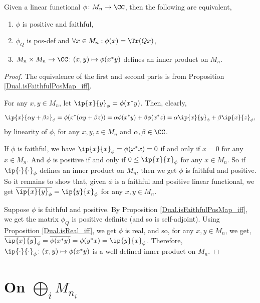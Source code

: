   \begin{theorem}\label{Dual.isFaithfulPosMap_tfae}
   \leanok
   Given a linear functional $\phi\colon{M_n}\to\CC$, then the following are equivalent,
   \begin{enumerate}[label=(\roman*)]
    \item $\phi$ is positive and faithful,
    \item $\phi_Q$ is pos-def and $\forall{x}\in{M_n}:\phi(x)=\Tr(Qx)$,
    \item $M_n\times{M_n}\to\CC\colon(x,y)\mapsto\phi(x^*y)$ defines an inner product on $M_n$.
   \end{enumerate}
  \end{theorem}
  \begin{proof}\leanok
   The equivalence of the first and second parts is from Proposition \ref{Dual.isFaithfulPosMap_iff}.
   
   For any $x,y\in{M_n}$, let $\ip{x}{y}_\phi=\phi(x^*y)$.
   Then, clearly,
   \[\ip{x}{\alpha{y}+\beta{z}}_\phi=\phi(x^*(\alpha{y}+\beta{z}))=\alpha\phi(x^*y)+\beta\phi(x^*z)=\alpha\ip{x}{y}_\phi+\beta\ip{x}{z}_\phi,\]
   by linearity of $\phi$, for any $x,y,z\in{M_n}$ and $\alpha,\beta\in\CC$.
   
   If $\phi$ is faithful, we have $\ip{x}{x}_\phi=\phi(x^*x)=0$ if and only if $x=0$ for any $x\in{M_n}$.
   And $\phi$ is positive if and only if $0\leq\ip{x}{x}_\phi$ for any $x\in{M_n}$. So if $\ip{\cdot}{\cdot}_\phi$ defines an inner product on $M_n$, then we get $\phi$ is faithful and positive. So it remains to show that, given $\phi$ is a faithful and positive linear functional, we get $\overline{\ip{x}{y}_\phi}=\ip{y}{x}_\phi$ for any $x,y\in{M_n}$.
     
   Suppose $\phi$ is faithful and positive. By Proposition \ref{Dual.isFaithfulPosMap_iff}, we get the matrix $\phi_Q$ is positive definite (and so is self-adjoint). Using Proposition \ref{Dual.isReal_iff}, we get $\phi$ is real, and so, for any $x,y\in{M_n}$, we get, $\overline{\ip{x}{y}_\phi}=\overline{\phi(x^*y)}=\phi(y^*x)=\ip{y}{x}_\phi$.
   Therefore, $\ip{\cdot}{\cdot}_\phi\colon(x,y)\mapsto\phi(x^*y)$ is a well-defined inner product on $M_n$.
  \end{proof}

\section{On $\bigoplus_iM_{n_i}$}


